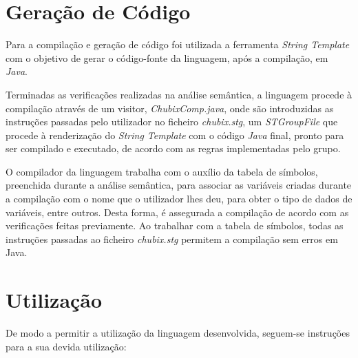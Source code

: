 \documentclass[10pt,portuguese]{article}
\begin{document}
\clearpage

\section{Geração de Código}

\par Para a compilação e geração de código foi utilizada a ferramenta \textit{String Template} com o objetivo de gerar o código-fonte da linguagem, após a compilação, em \textit{Java}.

\par Terminadas as verificações realizadas na análise semântica, a linguagem procede à compilação através de um visitor, \textit{ChubixComp.java}, onde são introduzidas as instruções passadas pelo utilizador no ficheiro \textit{chubix.stg}, um \textit{STGroupFile} que procede à renderização do \textit{String Template} com o código \textit{Java} final, pronto para ser compilado e executado, de acordo com as regras implementadas pelo grupo.

\par O compilador da linguagem trabalha com o auxílio da tabela de símbolos, preenchida durante a análise semântica, para associar as variáveis criadas durante a compilação com o nome que o utilizador lhes deu, para obter o tipo de dados de variáveis, entre outros. 
Desta forma, é assegurada a compilação de acordo com as verificações feitas previamente. Ao trabalhar com a tabela de símbolos, todas as instruções passadas ao ficheiro \textit{chubix.stg} permitem a compilação sem erros em Java.

\section{Utilização}

\par De modo a permitir a utilização da linguagem desenvolvida, seguem-se instruções para a sua devida utilização:
\end{document}
